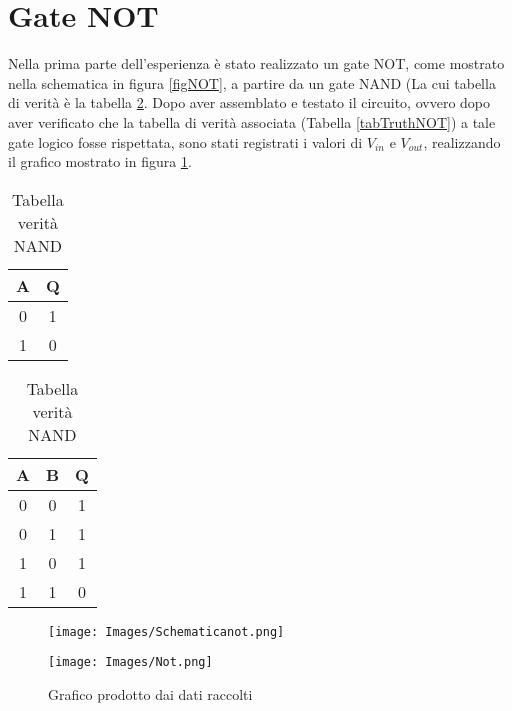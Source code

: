 \documentclass{article}
\begin{document}
    \section{Gate NOT}
    Nella prima parte dell'esperienza è stato realizzato un gate NOT, come mostrato nella schematica in figura \ref{figNOT}, a partire da un gate NAND (La cui tabella di verità è la tabella \ref{tabTruthNAND}. Dopo aver assemblato e testato il circuito, ovvero dopo aver verificato che la tabella di verità associata (Tabella \ref{tabTruthNOT}) a tale gate logico fosse rispettata, sono stati registrati i valori di $V_{in}$ e $V_{out}$, realizzando il grafico mostrato in figura \ref{figNotGraf}.
    
    
    \begin{table}[H]
    \centering
        \begin{minipage}[b]{0.32\hsize}\centering
            \begin{tabular}{ | c | c |}
               \hline
               A & Q \\ \hline \hline
               0 & 1 \\ \hline
               1 & 0 \\ \hline
            \end{tabular}
            \caption{Tabella verità NOT}
            \label{tabTruthNOT}
        \end{minipage}
        \begin{minipage}[b]{0.32\hsize}\centering
            \begin{tabular}{ | c | c | c |}
               \hline
               A & B & Q \\ \hline \hline
               0 & 0 & 1 \\ \hline
               0 & 1 & 1 \\ \hline
               1 & 0 & 1 \\ \hline
               1 & 1 & 0 \\ \hline
            \end{tabular}
            \caption{Tabella verità NAND}
            \label{tabTruthNAND}
        \end{minipage}
    \end{table}
    
    
    \begin{figure}[H]
          \centering
          \texttt{[image: Images/Schematicanot.png]}
          \caption{Schematica circuitale per il gate NOT}
          \label{figNOT}
        \endminipage
        \hspace{0.7cm}
          \centering
          \texttt{[image: Images/Not.png]}
          \caption{Grafico prodotto dai dati raccolti}
          \label{figNotGraf}
        \endminipage\hfill
    \end{figure}
        
\end{document}

